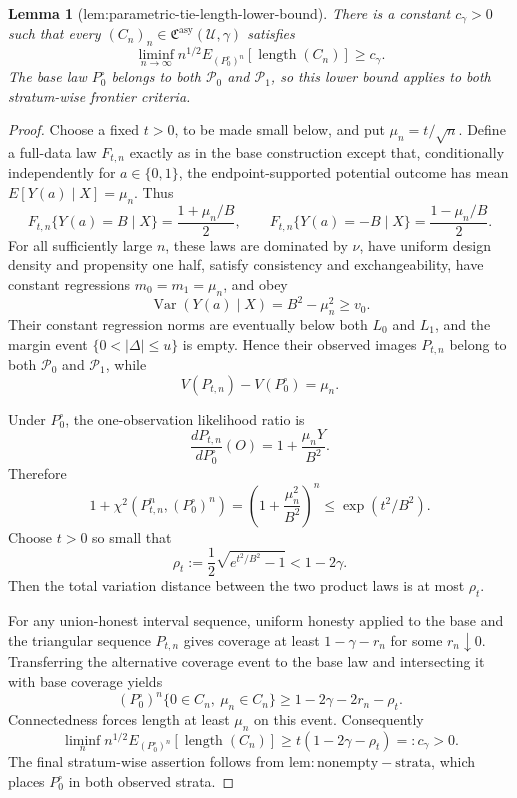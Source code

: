 \documentclass{article}
\newtheorem{lemma}{Lemma}
\begin{document}
\begin{lemma}[lem:parametric-tie-length-lower-bound]\label{lem:parametric-tie-length-lower-bound}
There is a constant \(c_\gamma>0\) such that every \((C_n)_n\in\mathfrak C^{\mathrm{asy}}(\mathcal U,\gamma)\) satisfies
\[
 \liminf_{n\to\infty}n^{1/2}E_{(P_0^\circ)^n}[\operatorname{length}(C_n)]\ge c_\gamma.
\]
The base law \(P_0^\circ\) belongs to both \(\mathcal P_0\) and \(\mathcal P_1\), so this lower bound applies to both stratum-wise frontier criteria.
\end{lemma}
\begin{proof}
Choose a fixed \(t>0\), to be made small below, and put \(\mu_n=t/\sqrt n\).  Define a full-data law \(F_{t,n}\) exactly as in the base construction except that, conditionally independently for \(a\in\{0,1\}\), the endpoint-supported potential outcome has mean \(E[Y(a)\mid X]=\mu_n\).  Thus
\[
 F_{t,n}\{Y(a)=B\mid X\}=\frac{1+\mu_n/B}{2},
 \qquad
 F_{t,n}\{Y(a)=-B\mid X\}=\frac{1-\mu_n/B}{2}.
\]
For all sufficiently large \(n\), these laws are dominated by \(\nu\), have uniform design density and propensity one half, satisfy consistency and exchangeability, have constant regressions \(m_0=m_1=\mu_n\), and obey
\[
 \operatorname{Var}(Y(a)\mid X)=B^2-\mu_n^2\ge v_0.
\]
Their constant regression norms are eventually below both \(L_0\) and \(L_1\), and the margin event \(\{0<|\Delta|\le u\}\) is empty.  Hence their observed images \(P_{t,n}\) belong to both \(\mathcal P_0\) and \(\mathcal P_1\), while
\[
 V(P_{t,n})-V(P_0^\circ)=\mu_n.
\]

Under \(P_0^\circ\), the one-observation likelihood ratio is
\[
 \frac{dP_{t,n}}{dP_0^\circ}(O)=1+\frac{\mu_nY}{B^2}.
\]
Therefore
\[
 1+\chi^2(P_{t,n}^n,(P_0^\circ)^n)
 =\left(1+\frac{\mu_n^2}{B^2}\right)^n
 \le\exp(t^2/B^2).
\]
Choose \(t>0\) so small that
\[
 \rho_t:=\frac12\sqrt{e^{t^2/B^2}-1}<1-2\gamma.
\]
Then the total variation distance between the two product laws is at most \(\rho_t\).

For any union-honest interval sequence, uniform honesty applied to the base and the triangular sequence \(P_{t,n}\) gives coverage at least \(1-\gamma-r_n\) for some \(r_n\downarrow0\).  Transferring the alternative coverage event to the base law and intersecting it with base coverage yields
\[
 (P_0^\circ)^n\{0\in C_n,\ \mu_n\in C_n\}
 \ge1-2\gamma-2r_n-\rho_t.
\]
Connectedness forces length at least \(\mu_n\) on this event.  Consequently
\[
 \liminf_n n^{1/2}E_{(P_0^\circ)^n}[\operatorname{length}(C_n)]
 \ge t(1-2\gamma-\rho_t)=:c_\gamma>0.
\]
The final stratum-wise assertion follows from \(\mathrm{lem:nonempty-strata}\), which places \(P_0^\circ\) in both observed strata.
\end{proof}
\end{document}
